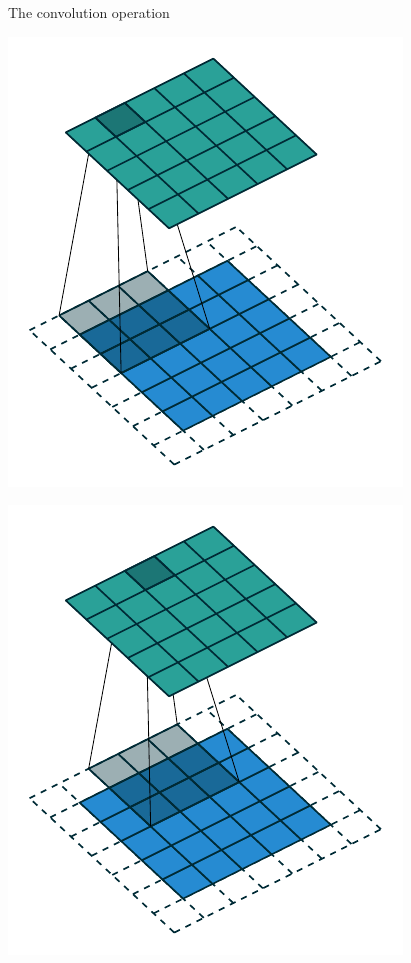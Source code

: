 \begin{frame}{The convolution operation}
\begin{minipage}{0.24\textwidth}
    \includegraphics[width=\textwidth]{images/conv_01.pdf}
  \end{minipage}
  \begin{minipage}{0.24\textwidth}
    \includegraphics[width=\textwidth]{images/conv_02.pdf}

\end{minipage}
\end{frame}
